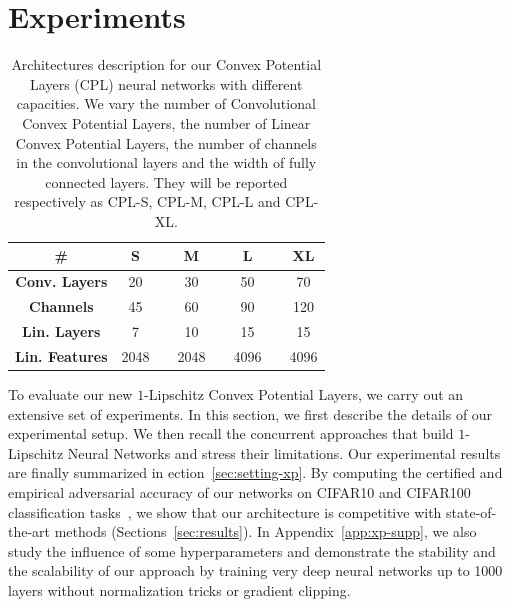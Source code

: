 \section{Experiments}
\label{section:experiments}
\begin{table}
\begin{center}
    \begin{tabular}{cccccccc}
    \toprule
    \textbf{\#} & \textbf{S} &  & \textbf{M} & & \textbf{L} & & \textbf{XL} \\
    \midrule
    \textbf{Conv. Layers}      & 20 & & 30 & & 50& & 70 \\
    \textbf{Channels}  &45 & & 60 & & 90 & & 120 \\ 
    \textbf{Lin. Layers}        &7 & & 10 & & 15 & & 15 \\
    \textbf{Lin. Features} & 2048 & & 2048 & & 4096 & & 4096 \\
    \bottomrule
    \end{tabular}%

\end{center}
\caption{\label{table:model-desc}
Architectures description for our Convex Potential Layers (CPL) neural networks with different capacities. We vary the number of Convolutional Convex Potential Layers, the number of Linear Convex Potential Layers, the number of channels in the convolutional layers and the width of fully
connected layers. They will be reported respectively as CPL-S, CPL-M, CPL-L and CPL-XL.}
\end{table}

To evaluate our new $1$-Lipschitz Convex Potential Layers, we carry out an extensive set of experiments. In this section, we first describe  the details of our experimental setup. We then recall  the concurrent approaches that build $1$-Lipschitz Neural Networks and stress their limitations. Our experimental results are finally summarized in ection~\ref{sec:setting-xp}. By computing the certified and empirical adversarial  accuracy of our networks on CIFAR10 and CIFAR100 classification tasks~\citep{krizhevsky2009learning}, we show that our architecture is competitive with state-of-the-art methods (Sections~\ref{sec:results}). In Appendix~\ref{app:xp-supp}, we also study the influence of some hyperparameters and demonstrate the stability and the scalability of our approach by training very deep neural networks up to 1000 layers without normalization tricks or gradient clipping.










